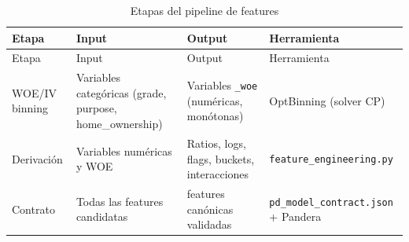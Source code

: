 \documentclass[
  spanish,
  11pt,
  letterpaper,
]{scrbook}
\theoremstyle{plain}
\theoremstyle{remark}
\begin{document}
\begin{longtable}[]{@{}
  >{\raggedright\arraybackslash}p{}
  >{\raggedright\arraybackslash}p{}
  >{\raggedright\arraybackslash}p{}
  >{\raggedright\arraybackslash}p{}@{}}
\caption{Etapas del pipeline de
features}\label{tbl-feature-stages}\tabularnewline
\toprule\noalign{}
\begin{minipage}[b]{\linewidth}\raggedright
Etapa
\end{minipage} & \begin{minipage}[b]{\linewidth}\raggedright
Input
\end{minipage} & \begin{minipage}[b]{\linewidth}\raggedright
Output
\end{minipage} & \begin{minipage}[b]{\linewidth}\raggedright
Herramienta
\end{minipage} \\
\midrule\noalign{}
\endfirsthead
\toprule\noalign{}
\begin{minipage}[b]{\linewidth}\raggedright
Etapa
\end{minipage} & \begin{minipage}[b]{\linewidth}\raggedright
Input
\end{minipage} & \begin{minipage}[b]{\linewidth}\raggedright
Output
\end{minipage} & \begin{minipage}[b]{\linewidth}\raggedright
Herramienta
\end{minipage} \\
\midrule\noalign{}
\endhead
\bottomrule\noalign{}
\endlastfoot
WOE/IV binning & Variables categóricas (grade, purpose, home\_ownership)
& Variables \texttt{\_woe} (numéricas, monótonas) & OptBinning (solver
CP) \\
Derivación & Variables numéricas y WOE & Ratios, logs, flags, buckets,
interacciones & \texttt{feature\_engineering.py} \\
Contrato & Todas las features candidatas & 42 features canónicas
validadas & \texttt{pd\_model\_contract.json} + Pandera \\
\end{longtable}
\end{document}
